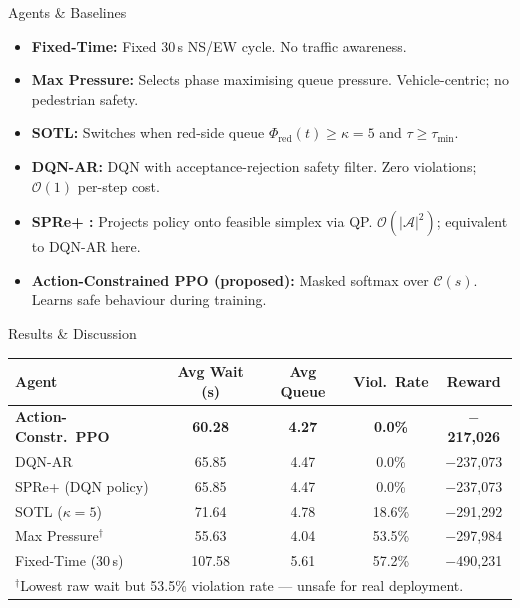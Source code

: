 \documentclass[final,18pt]{beamer}
\newlength{\colwidth}
\begin{document}
\begin{frame}[t]
\begin{columns}[t]
\begin{column}{\colwidth}
  \begin{block}{Agents \& Baselines}
    \begin{itemize}
      \item \textbf{Fixed-Time:} Fixed 30\,s NS/EW cycle. No traffic awareness.
      \item \textbf{Max Pressure:} Selects phase maximising
        queue pressure. Vehicle-centric; no pedestrian safety.
      \item \textbf{SOTL:} Switches when red-side queue
        $\Phi_\text{red}(t)\!\geq\!\kappa\!=\!5$ and $\tau\!\geq\!\tau_\text{min}$.
      \item \textbf{DQN-AR:} DQN with acceptance-rejection safety filter.
        Zero violations; $\mathcal{O}(1)$ per-step cost.
      \item \textbf{SPRe+ :} Projects policy onto feasible simplex
        via QP. $\mathcal{O}(|\mathcal{A}|^2)$; equivalent to DQN-AR here.
      \item \textbf{Action-Constrained PPO (proposed):} Masked softmax over
        $\mathcal{C}(s)$. Learns safe behaviour during training.
    \end{itemize}
  \end{block}
  \begin{block}{Results \& Discussion}


    \begin{center}
    \begin{tabular}{lcccc}
      \toprule
      \textbf{Agent} & \textbf{Avg Wait (s)} & \textbf{Avg Queue}
                     & \textbf{Viol.\ Rate}  & \textbf{Reward} \\
      \midrule
      \textbf{Action-Constr.\ PPO} & \textbf{60.28} & \textbf{4.27}
                                   & \textbf{0.0\%} & \textbf{$-$217,026} \\
      DQN-AR              & 65.85 & 4.47 & 0.0\%  & $-$237,073 \\
      SPRe+ (DQN policy)  & 65.85 & 4.47 & 0.0\%  & $-$237,073 \\
      SOTL ($\kappa\!=\!5$) & 71.64 & 4.78 & 18.6\% & $-$291,292 \\
      Max Pressure$^\dagger$ & 55.63 & 4.04 & 53.5\% & $-$297,984 \\
      Fixed-Time (30\,s)  & 107.58 & 5.61 & 57.2\% & $-$490,231 \\
      \bottomrule
      \multicolumn{5}{l}{\small $^\dagger$Lowest raw wait but 53.5\% violation
        rate --- unsafe for real deployment.}
    \end{tabular}
    \end{center}


\end{block}
\end{column}
\end{columns}
\end{frame}
\end{document}
